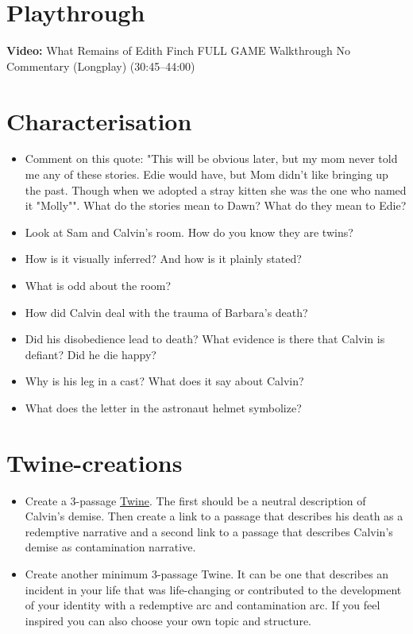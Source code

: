 \documentclass[11pt,a4paper,oneside]{book}
\begin{document}
\section*{Playthrough}

\par\noindent\textbf{Video:} What Remains of Edith Finch FULL GAME Walkthrough No Commentary (Longplay) (30:45–44:00)\par\medskip

\section*{Characterisation}

\begin{itemize}
\item Comment on this quote: "This will be obvious later, but my mom never told me any of these stories. Edie would have, but Mom didn't like bringing up the past. Though when we adopted a stray kitten she was the one who named it "Molly"". What do the stories mean to Dawn? What do they mean to Edie?
\item Look at Sam and Calvin’s room. How do you know they are twins?
\item How is it visually inferred? And how is it plainly stated?
\item What is odd about the room?
\item How did Calvin deal with the trauma of Barbara’s death?
\item Did his disobedience lead to death? What evidence is there that Calvin is defiant? Did he die happy?
\item Why is his leg in a cast? What does it say about Calvin?
\item What does the letter in the astronaut helmet symbolize?
\end{itemize}

\section*{Twine-creations}

\begin{itemize}
\item Create a 3-passage \href{https://twinery.org}{Twine}. The first should be a neutral description of Calvin’s demise. Then create a link to a passage that describes his death as a redemptive narrative and a second link to a passage that describes Calvin’s demise as contamination narrative.
\item Create another minimum 3-passage Twine. It can be one that describes an incident in your life that was life-changing or contributed to the development of your identity with a redemptive arc and contamination arc. If you feel inspired you can also choose your own topic and structure.
\end{itemize}
\end{document}
